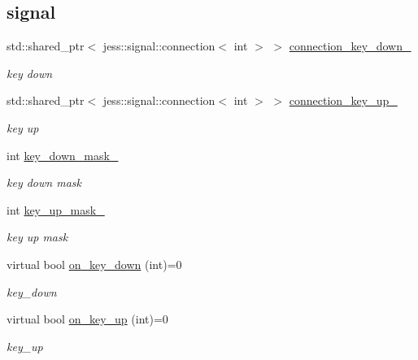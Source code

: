 \subsection*{signal}
\label{_amgrp521345a9fb579f52117f27be6e0673ee}
 \begin{DoxyCompactItemize}
\item 
std::shared\_\-ptr$<$ jess::signal::connection$<$ int $>$ $>$ \hyperlink{classnebula_1_1ui_1_1object_1_1base_a345044fef1a810531d75b5a59c862c02}{connection\_\-key\_\-down\_\-}
\begin{DoxyCompactList}\small\item\em key down \item\end{DoxyCompactList}\item 
std::shared\_\-ptr$<$ jess::signal::connection$<$ int $>$ $>$ \hyperlink{classnebula_1_1ui_1_1object_1_1base_afbb81761ef556b5d9c05db9b1c1389f0}{connection\_\-key\_\-up\_\-}
\begin{DoxyCompactList}\small\item\em key up \item\end{DoxyCompactList}\item 
int \hyperlink{classnebula_1_1ui_1_1object_1_1base_a0be685b1e1f6ad0c51d0a605e241cc50}{key\_\-down\_\-mask\_\-}
\begin{DoxyCompactList}\small\item\em key down mask \item\end{DoxyCompactList}\item 
int \hyperlink{classnebula_1_1ui_1_1object_1_1base_aa50a040968d4027b1371082520d370fc}{key\_\-up\_\-mask\_\-}
\begin{DoxyCompactList}\small\item\em key up mask \item\end{DoxyCompactList}\item 
virtual bool \hyperlink{classnebula_1_1ui_1_1object_1_1base_a239afd11ea6371cdf4551a4e3c99a84c}{on\_\-key\_\-down} (int)=0
\begin{DoxyCompactList}\small\item\em key\_\-down \item\end{DoxyCompactList}\item 
virtual bool \hyperlink{classnebula_1_1ui_1_1object_1_1base_aa65861b29412bd80cb57a6cad8c12141}{on\_\-key\_\-up} (int)=0
\begin{DoxyCompactList}\small\item\em key\_\-up \item\end{DoxyCompactList}\end{DoxyCompactItemize}


